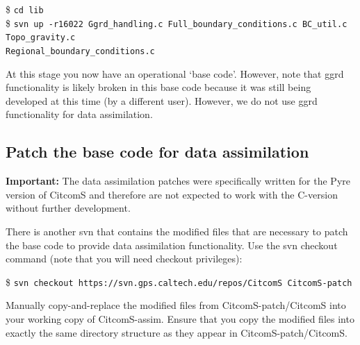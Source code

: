 \documentclass[letterpaper,12pt]{article}
\newcommand{\tm}[1]{\$ \texttt{#1}}
\begin{document}
\tm{cd lib}\\
\tm{svn up -r16022 Ggrd\_handling.c Full\_boundary\_conditions.c BC\_util.c Topo\_gravity.c \\Regional\_boundary\_conditions.c }

At this stage you now have an operational `base code'.  However, note that ggrd functionality is likely broken in this base code because it was still being developed at this time (by a different user).  However, we do not use ggrd functionality for data assimilation.

\subsection{Patch the base code for data assimilation}

\textbf{Important:} The data assimilation patches were specifically written for the Pyre version of CitcomS and therefore are not expected to work with the C-version without further development.

There is another svn that contains the modified files that are necessary to patch the base code to provide data assimilation functionality.  Use the svn checkout command (note that you will need checkout privileges):

\tm{svn checkout https://svn.gps.caltech.edu/repos/CitcomS CitcomS-patch}

Manually copy-and-replace the modified files from CitcomS-patch/CitcomS into your working copy of CitcomS-assim.   Ensure that you copy the modified files into exactly the same directory structure as they appear in CitcomS-patch/CitcomS.
\end{document}
